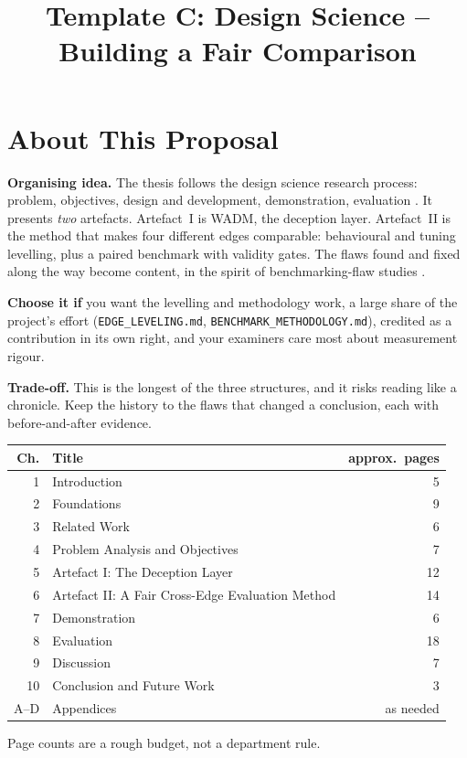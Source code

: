 \documentclass{rptuma}
\title{Template C: Design Science -- Building a Fair Comparison}
\begin{document}
\maketitle
{}
\setcounter{page}{1}

\chapter*{About This Proposal}

\textbf{Organising idea.} The thesis follows the design science research process: problem,
objectives, design and development, demonstration, evaluation \cite{peffers2007dsrm}. It presents
\emph{two} artefacts. Artefact~I is WADM, the deception layer. Artefact~II is the method that makes
four different edges comparable: behavioural and tuning levelling, plus a paired benchmark with
validity gates. The flaws found and fixed along the way become content, in the spirit of
benchmarking-flaw studies \cite{vanderkouwe2019sok}.

\textbf{Choose it if} you want the levelling and methodology work, a large share of the project's
effort (\texttt{EDGE\_LEVELING.md}, \texttt{BENCHMARK\_METHODOLOGY.md}), credited as a contribution
in its own right, and your examiners care most about measurement rigour.

\textbf{Trade-off.} This is the longest of the three structures, and it risks reading like a
chronicle. Keep the history to the flaws that changed a conclusion, each with before-and-after
evidence.

\begin{center}
\small
\begin{tabularx}{\textwidth}{@{}rXr@{}}
\toprule
Ch. & Title & approx.\ pages \\
\midrule
1 & Introduction & 5 \\
2 & Foundations & 9 \\
3 & Related Work & 6 \\
4 & Problem Analysis and Objectives & 7 \\
5 & Artefact I: The Deception Layer & 12 \\
6 & Artefact II: A Fair Cross-Edge Evaluation Method & 14 \\
7 & Demonstration & 6 \\
8 & Evaluation & 18 \\
9 & Discussion & 7 \\
10 & Conclusion and Future Work & 3 \\
A--D & Appendices & as needed \\
\bottomrule
\end{tabularx}
\end{center}
{\footnotesize Page counts are a rough budget, not a department rule.}
\end{document}
